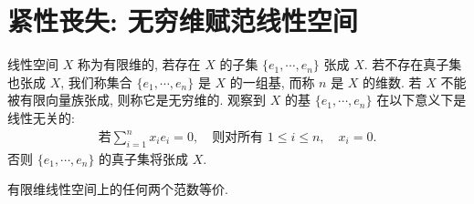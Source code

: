 \documentclass[../../main.tex]{subfiles}
\begin{document}
\section{紧性丧失: 无穷维赋范线性空间}\label{section:ch13-紧性丧失}

线性空间 $X$ 称为有限维的, 若存在 $X$ 的子集 $\{e_{1},\cdots,e_{n}\}$ 张成 $X$. 若不存在真子集也张成 $X$, 我们称集合 $\{e_{1},\cdots,e_{n}\}$ 是 $X$ 的一组基, 而称 $n$ 是 $X$ 的维数. 若 $X$ 不能被有限向量族张成, 则称它是无穷维的. 观察到 $X$ 的基 $\{e_{1},\cdots,e_{n}\}$ 在以下意义下是线性无关的:
\begin{align*}
\text{若}\sum_{i=1}^{n}x_{i}e_{i}=0,\quad\text{则对所有 }1\leqslant i\leqslant n,\quad x_{i}=0.
\end{align*}
否则 $\{e_{1},\cdots,e_{n}\}$ 的真子集将张成 $X$.

\begin{theorem}\label{theorem:ch13-有限维范数等价}
有限维线性空间上的任何两个范数等价.
\end{theorem}
\end{document}
